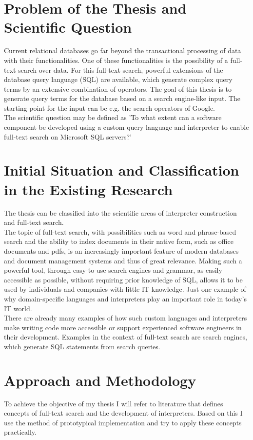 \section{Problem of the Thesis and Scientific Question}
Current relational databases go far beyond the transactional processing of data with their functionalities. One of these functionalities is the possibility of a full-text search over data. For this full-text search, powerful extensions of the database query language (SQL) are available, which generate complex query terms by an extensive combination of operators. The goal of this thesis is to generate query terms for the database based on a search engine-like input. The starting point for the input can be e.g. the search operators of Google.\\
The scientific question may be defined as 'To what extent can a software component be developed using a custom query language and interpreter to enable full-text search on Microsoft SQL servers?'
\section{Initial Situation and Classification in the Existing Research}
The thesis can be classified into the scientific areas of interpreter construction and full-text search.\\
The topic of full-text search, with possibilities such as word and phrase-based search and the ability to index documents in their native form, such as office documents and pdfs, is an increasingly important feature of modern databases and document management systems and thus of great relevance. Making such a powerful tool, through easy-to-use search engines and grammar, as easily accessible as possible, without requiring prior knowledge of SQL, allows it to be used by individuals and companies with little IT knowledge. Just one example of why domain-specific languages and interpreters play an important role in today's IT world.\\
There are already many examples of how such custom languages and interpreters make writing code more accessible or support experienced software engineers in their development. Examples in the context of full-text search are search engines, which generate SQL statements from search queries.
\section{Approach and Methodology}
To achieve the objective of my thesis I will refer to literature that defines concepts of full-text search and the development of interpreters. Based on this I use the method of prototypical implementation and try to apply these concepts practically.

